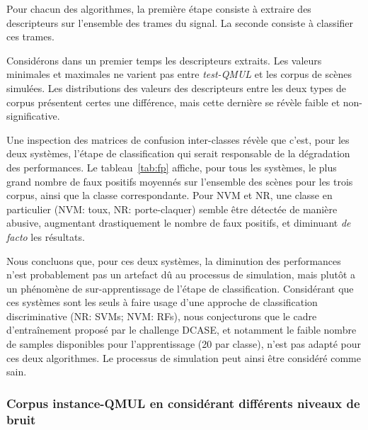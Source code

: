 Pour chacun des algorithmes, la première étape consiste à extraire des descripteurs sur l'ensemble des trames du signal. La seconde consiste à classifier ces trames.

Considérons dans un premier temps les descripteurs extraits. Les valeurs minimales et maximales ne varient pas entre \emph{test-QMUL} et les corpus de scènes simulées. Les distributions des valeurs des descripteurs entre les deux types de corpus présentent certes une différence, mais cette dernière se révèle faible et non-significative. 

Une inspection des matrices de confusion inter-classes révèle que c'est, pour les deux systèmes, l'étape de classification qui serait responsable de la dégradation des performances. Le tableau~\ref{tab:fp} affiche, pour tous les systèmes, le plus grand nombre de faux positifs moyennés sur l'ensemble des scènes pour les trois corpus, ainsi que la classe correspondante. Pour NVM et NR, une classe en particulier (NVM: toux, NR: porte-claquer) semble être détectée de manière abusive, augmentant drastiquement le nombre de faux positifs, et diminuant \emph{de facto} les résultats.

Nous concluons que, pour ces deux systèmes, la diminution des performances n'est probablement pas un artefact dû au processus de simulation, mais plutôt a un phénomène de sur-apprentissage de l'étape de classification. Considérant que ces systèmes sont les seuls à faire usage d'une approche de classification discriminative (NR: SVMs; NVM: RFs), nous conjecturons que le cadre d'entraînement proposé par le challenge DCASE, et notamment le faible nombre de samples disponibles pour l'apprentissage (20 par classe), n'est pas adapté pour ces deux algorithmes. Le processus de simulation peut ainsi être considéré comme sain.

\subsubsection{Corpus instance-QMUL en considérant différents niveaux de bruit}

